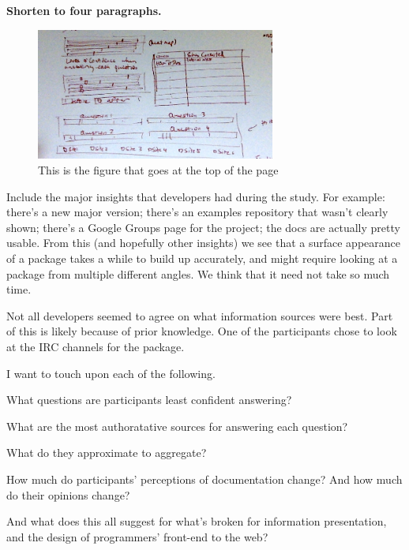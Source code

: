 \textbf{Shorten to four paragraphs.}

\begin{figure}
\centering
\includegraphics[width=0.7\textwidth]{figures/top_of_page}
\caption{This is the figure that goes at the top of the page}
\label{fig:top_of_page}
\end{figure}

Include the major insights that developers had during the study.
For example:
there's a new major version;
there's an examples repository that wasn't clearly shown;
there's a Google Groups page for the project;
the docs are actually pretty usable.
From this (and hopefully other insights) we see that a surface appearance of a package takes a while to build up accurately, and might require looking at a package from multiple different angles.
We think that it need not take so much time.

Not all developers seemed to agree on what information sources were best.
Part of this is likely because of prior knowledge.
One of the participants chose to look at the IRC channels for the package.

I want to touch upon each of the following.

What questions are participants least confident answering?

What are the most authoratative sources for answering each question?

What do they approximate to aggregate?

How much do participants' perceptions of documentation change?  And how much do their opinions change?

And what does this all suggest for what's broken for information presentation, and the design of programmers' front-end to the web?
